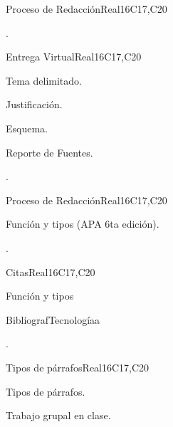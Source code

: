 \begin{syllabus}
\begin{unit}{Proceso de Redacción}{}{Real}{16}{C17,C20}
  \begin{learningoutcomes}
   \item .%
  \end{learningoutcomes}
\end{unit}

\begin{unit}{Entrega Virtual}{}{Real}{16}{C17,C20}
  \begin{topics}
      \item Tema delimitado.
      \item Justificación.
      \item Esquema.
      \item Reporte de Fuentes.
  \end{topics}

  \begin{learningoutcomes}
   \item .%
  \end{learningoutcomes}
\end{unit}

\begin{unit}{Proceso de Redacción}{}{Real}{16}{C17,C20}
  \begin{topics}
      \item Función y tipos (APA 6ta edición).
  \end{topics}

  \begin{learningoutcomes}
   \item .%
  \end{learningoutcomes}
\end{unit}

\begin{unit}{Citas}{}{Real}{16}{C17,C20}
  \begin{topics}
      \item Función y tipos
      \item BibliografTecnologíaa
  \end{topics}

  \begin{learningoutcomes}
   \item .%
  \end{learningoutcomes}
\end{unit}

\begin{unit}{Tipos de párrafos}{}{Real}{16}{C17,C20}
  \begin{topics}
      \item Tipos de párrafos.
      \item Trabajo grupal en clase.
  \end{topics}


\end{unit}
\end{syllabus}
